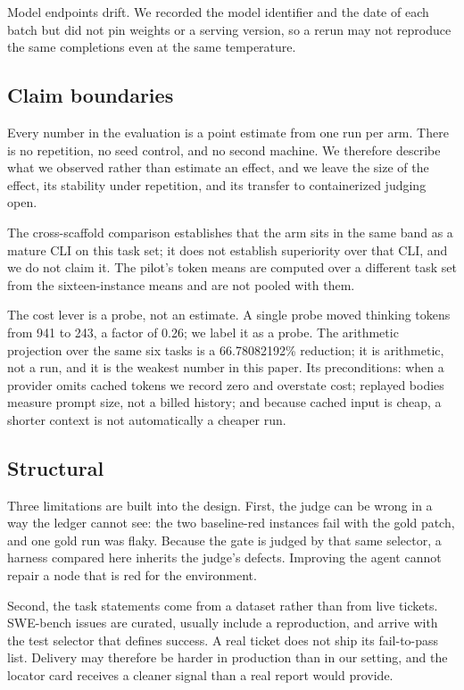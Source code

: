 Model endpoints drift. We recorded the model identifier and the date of each batch but did not pin weights or a serving version, so a rerun may not reproduce the same completions even at the same temperature.

\subsection{Claim boundaries}

Every number in the evaluation is a point estimate from one run per arm. There is no repetition, no seed control, and no second machine. We therefore describe what we observed rather than estimate an effect, and we leave the size of the effect, its stability under repetition, and its transfer to containerized judging open.

The cross-scaffold comparison establishes that the arm sits in the same band as a mature CLI on this task set; it does not establish superiority over that CLI, and we do not claim it. The pilot's token means are computed over a different task set from the sixteen-instance means and are not pooled with them.

The cost lever is a probe, not an estimate. A single probe moved thinking tokens from 941 to 243, a factor of 0.26; we label it as a probe. The arithmetic projection over the same six tasks is a 66.78082192\% reduction; it is arithmetic, not a run, and it is the weakest number in this paper. Its preconditions: when a provider omits cached tokens we record zero and overstate cost; replayed bodies measure prompt size, not a billed history; and because cached input is cheap, a shorter context is not automatically a cheaper run.

\subsection{Structural}

Three limitations are built into the design. First, the judge can be wrong in a way the ledger cannot see: the two baseline-red instances fail with the gold patch, and one gold run was flaky. Because the gate is judged by that same selector, a harness compared here inherits the judge's defects. Improving the agent cannot repair a node that is red for the environment.

Second, the task statements come from a dataset rather than from live tickets. SWE-bench issues are curated, usually include a reproduction, and arrive with the test selector that defines success. A real ticket does not ship its fail-to-pass list. Delivery may therefore be harder in production than in our setting, and the locator card receives a cleaner signal than a real report would provide.

